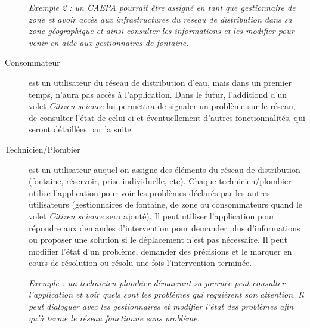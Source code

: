 \documentclass[a4paper, 11pt]{article}
\begin{document}
\begin{description}
    \emph{Exemple 2 : un CAEPA pourrait être assigné en tant que gestionnaire de zone et avoir accès aux infrastructures du réseau de distribution dans sa zone géographique et ainsi consulter les informations et les modifier pour venir en aide aux gestionnaires de fontaine.}

    \item[Consommateur] est un utilisateur du réseau de distribution d'eau, mais dans un premier temps, n'aura pas accès à l'application. Dans le futur, l'additiond d'un volet \emph{Citizen science} lui permettra de signaler un problème sur le réseau, de consulter l'état de celui-ci et éventuellement d'autres fonctionnalités, qui seront détaillées par la suite.

    \item[Technicien/Plombier] est un utilisateur auquel on assigne des éléments du réseau de distribution (fontaine, réservoir, prise individuelle, etc). Chaque technicien/plombier utilise l'application pour voir les problèmes déclarés par les autres utilisateurs (gestionnaires de fontaine, de zone ou consommateurs quand le volet \emph{Citizen science} sera ajouté). Il peut utiliser l'application pour répondre aux demandes d'intervention pour demander plus d'informations ou proposer une solution si le déplacement n'est pas nécessaire. Il peut modifier l'état d'un problème, demander des précisions et le marquer en cours de résolution ou résolu une fois l'intervention terminée.

    \emph{Exemple : un technicien plombier démarrant sa journée peut consulter l'application et voir quels sont les problèmes qui requièrent son attention. Il peut dialoguer avec les gestionnaires et modifier l'état des problèmes afin qu'à terme le réseau fonctionne sans problème.}

  \end{description}
\end{document}
